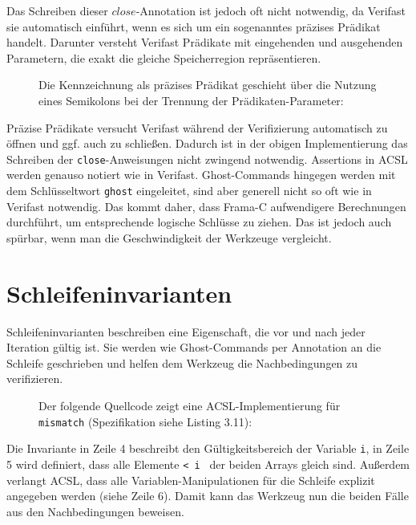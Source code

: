 Das Schreiben dieser \(close\)-Annotation ist jedoch oft nicht notwendig, da Verifast sie automatisch
einführt, wenn es sich um ein sogenanntes präzises Prädikat handelt. Darunter versteht Verifast Prädikate mit 
eingehenden und ausgehenden Parametern, die exakt die gleiche Speicherregion repräsentieren. 

\begin{figure}[H]
Die Kennzeichnung als präzises Prädikat geschieht über die Nutzung eines Semikolons bei der Trennung
der Prädikaten-Parameter:


\end{figure}
Präzise Prädikate versucht Verifast während der Verifizierung automatisch zu öffnen und ggf. auch zu
schließen. Dadurch ist in der obigen Implementierung das Schreiben der \texttt{close}-Anweisungen
nicht zwingend notwendig.
\newline
\newline
Assertions in ACSL werden genauso notiert wie in Verifast. Ghost-Commands hingegen werden
mit dem Schlüsseltwort \lstinline{ghost} eingeleitet, sind aber generell nicht so oft wie in
Verifast notwendig. Das kommt daher, dass Frama-C aufwendigere Berechnungen durchführt, um
entsprechende logische Schlüsse zu ziehen. Das ist jedoch auch spürbar, wenn man die
Geschwindigkeit der Werkzeuge vergleicht.


\section{Schleifeninvarianten}

Schleifeninvarianten beschreiben eine Eigenschaft, die vor und nach jeder Iteration gültig ist. Sie
werden wie Ghost-Commands per Annotation an die Schleife geschrieben und helfen dem Werkzeug die
Nachbedingungen zu verifizieren.

\begin{figure}[H]
Der folgende Quellcode zeigt eine ACSL-Implementierung für \lstinline{mismatch}
(Spezifikation siehe Listing 3.11):

\end{figure}

Die Invariante in Zeile 4 beschreibt den Gültigkeitsbereich der Variable \lstinline{i}, in Zeile 5 wird definiert, 
dass alle Elemente \lstinline{< i } der beiden Arrays gleich sind. Außerdem verlangt ACSL, dass alle
Variablen-Manipulationen für die Schleife explizit angegeben werden (siehe Zeile 6). Damit kann das Werkzeug
nun die beiden Fälle aus den Nachbedingungen beweisen.

